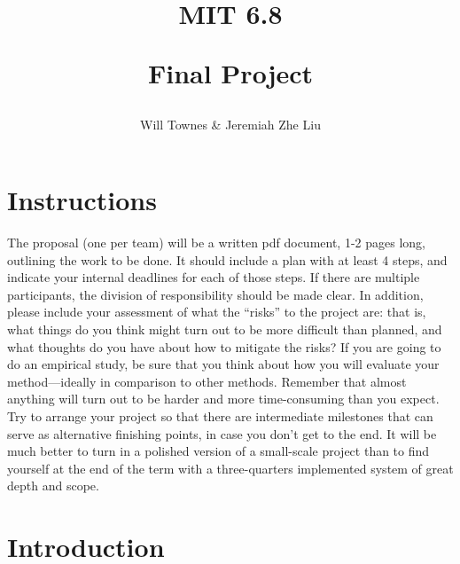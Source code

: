 \documentclass[12pt]{article}
\begin{document}
\title{MIT 6.8\item Final Project}
\author{Will Townes \& Jeremiah Zhe Liu}
\maketitle

\section{Instructions} %
The proposal (one per team) will be a written pdf document, 1-2 pages long, outlining the work to be done. It should include a plan with at least 4 steps, and indicate your internal deadlines for each of those steps. If there are multiple participants, the division of responsibility should be made clear. In addition, please include your assessment of what the “risks” to the project are: that is, what things do you think might turn out to be more difficult than planned, and what thoughts do you have about how to mitigate the risks?
If you are going to do an empirical study, be sure that you think about how you will evaluate your method—ideally in comparison to other methods.
Remember that almost anything will turn out to be harder and more time-consuming than you expect. Try to arrange your project so that there are intermediate milestones that can serve as alternative finishing points, in case you don’t get to the end. It will be much better to turn in a polished version of a small-scale project than to find yourself at the end of the term with a three-quarters implemented system of great depth and scope.

\section{Introduction}
\end{document}
